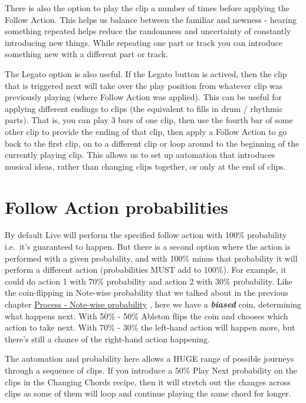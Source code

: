 \documentclass[
  12pt,
  letterpaper,
  oneside,
  open=any]{scrbook}
\begin{document}
There is also the option to play the clip a number of times before
applying the Follow Action. This helps us balance between the familiar
and newness - hearing something repeated helps reduce the randomness and
uncertainty of constantly introducing new things. While repeating one
part or track you can introduce something new with a different part or
track.

The Legato option is also useful. If the Legato button is actived, then
the clip that is triggered next will take over the play position from
whatever clip was previously playing (where Follow Action was applied).
This can be useful for applying different endings to clips (the
equivalent to fills in drum / rhythmic parts). That is, you can play 3
bars of one clip, then use the fourth bar of some other clip to provide
the ending of that clip, then apply a Follow Action to go back to the
first clip, on to a different clip or loop around to the beginning of
the currently playing clip. This allows us to set up automation that
introduces musical ideas, rather than changing clips together, or only
at the end of clips.

\section{Follow Action probabilities}\label{follow-action-probabilities}

By default Live will perform the specified follow action with 100\%
probability i.e.~it's guaranteed to happen. But there is a second option
where the action is performed with a given probability, and with 100\%
minus that probability it will perform a different action (probabilities
MUST add to 100\%). For example, it could do action 1 with 70\%
probability and action 2 with 30\% probability. Like the coin-flipping
in Note-wise probability that we talked about in the previous chapter
\hyperref[Chapter-002-Process-Note_wise_probability]{Process - Note-wise
probability} , here we have a \textbf{\emph{biased}} coin, determining
what happens next. With 50\% - 50\% Ableton flips the coin and chooses
which action to take next. With 70\% - 30\% the left-hand action will
happen more, but there's still a chance of the right-hand action
happening.

The automation and probability here allows a HUGE range of possible
journeys through a sequence of clips. If you introduce a 50\% Play Next
probability on the clips in the Changing Chords recipe, then it will
stretch out the changes across clips as some of them will loop and
continue playing the same chord for longer.
\end{document}
